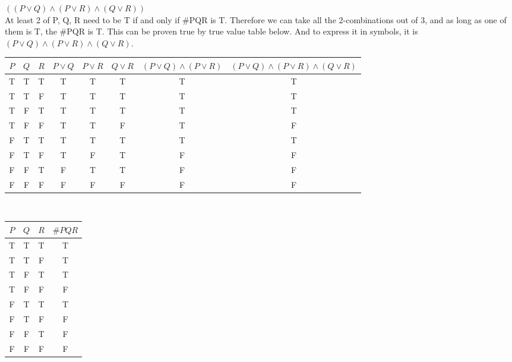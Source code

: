 \documentclass[12pt]{exam}
\begin{document}
\begin{solution} 
$(( P \lor Q) \land (P \lor R) \land (Q \lor R))$ \\
At least 2 of P, Q, R need to be T if and only if \#PQR is T. Therefore we can take all the 2-combinations out of 3, and as long as one of them is T, the \#PQR is T. This can be proven true by true value table below. And to express it in symbols, it is $( P \lor Q) \land (P \lor R) \land (Q \lor R)$. \\

\begin{tabular}{c|c|c|c|c|c|c|c}
    $P$ & $Q$ & $R$ &$P \lor Q$ & $P \lor R$ & $Q \lor R$ & $(P \lor Q) \land (P \lor R)$ &$( P \lor Q) \land (P \lor R) \land (Q \lor R)$\\
    \hline
    T & T & T & T & T & T & T & T \\
    T & T & F & T & T & T & T & T \\
    T & F & T & T & T & T & T & T \\
    T & F & F & T & T & F & T & F\\
    F & T & T & T & T & T & T & T\\
    F & T & F & T & F & T & F & F \\
    F & F & T & F & T & T & F & F\\
    F & F & F & F & F & F & F & F\\
\end{tabular} \\

\begin{tabular}{c|c|c|c}
    $P$ & $Q$ & $R$ & $\#PQR$\\
    \hline
    T & T & T & T \\
    T & T & F & T\\
    T & F & T & T \\
    T & F & F & F \\
    F & T & T & T \\
    F & T & F & F \\
    F & F & T & F \\
    F & F & F & F \\
\end{tabular} \\
\end{solution}
\end{document}
